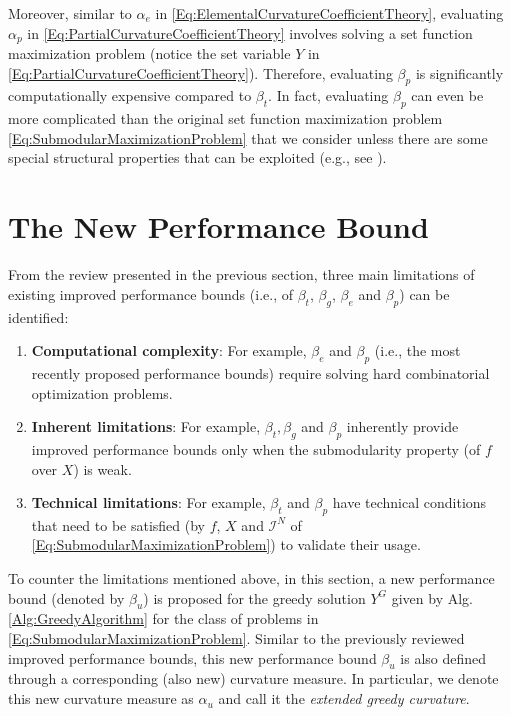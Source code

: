 \documentclass[conference]{IEEEtran}
\begin{document}
Moreover, similar to $\alpha_e$ in \eqref{Eq:ElementalCurvatureCoefficientTheory}, evaluating $\alpha_p$ in \eqref{Eq:PartialCurvatureCoefficientTheory} involves solving a set function maximization problem (notice the set variable $Y$ in \eqref{Eq:PartialCurvatureCoefficientTheory}). Therefore, evaluating $\beta_p$ is significantly computationally expensive compared to $\beta_t$. In fact, evaluating $\beta_p$ can even be more complicated than the original set function maximization problem \eqref{Eq:SubmodularMaximizationProblem} that we consider unless there are some special structural properties that can be exploited (e.g., see \cite[Ch. 3.2.4]{Welikala2021Thesis}).





\section{The New Performance Bound}
\label{Sec:NewPerformanceBound}


 

From the review presented in the previous section, three main limitations of existing improved performance bounds (i.e., of $\beta_t$\cite{Conforti1984}, $\beta_g$\cite{Conforti1984}, $\beta_e$\cite{Wang2016} and $\beta_p$\cite{Liu2018}) can be identified: 
\begin{enumerate}
    \item \textbf{Computational complexity}: For example, $\beta_e$ and $\beta_p$ (i.e., the most recently proposed performance bounds) require solving hard combinatorial optimization problems. 
    \item \textbf{Inherent limitations}: For example, $\beta_t, \beta_g$ and $\beta_p$ inherently provide improved performance bounds only when the submodularity property (of $f$ over $X$) is weak.
    \item \textbf{Technical limitations}: For example, $\beta_t$ and $\beta_p$ have technical conditions that need to be satisfied (by $f$, $X$ and $\mathcal{I}^N$ of \eqref{Eq:SubmodularMaximizationProblem}) to validate their usage.
\end{enumerate}


To counter the limitations mentioned above, in this section, a new performance bound (denoted by $\beta_u$) is proposed for the greedy solution $Y^G$ given by Alg. \ref{Alg:GreedyAlgorithm} for the class of problems in \eqref{Eq:SubmodularMaximizationProblem}. Similar to the previously reviewed improved performance bounds, this new performance bound $\beta_u$ is also defined through a corresponding (also new) curvature measure. In particular, we denote this new curvature measure as $\alpha_u$ and call it the \emph{extended greedy curvature}.
\end{document}
